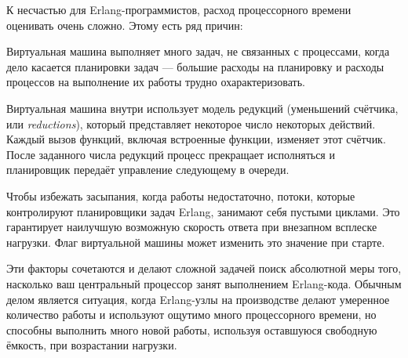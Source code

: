 \documentclass[11pt, oneside]{book}   	%
\begin{document}
К несчастью для Erlang-программистов, расход процессорного времени оценивать очень сложно. Этому есть ряд причин:

\begin{itemize*}
	\item Виртуальная машина выполняет много задач, не связанных с процессами, когда дело касается планировки задач --- большие расходы на планировку и расходы процессов на выполнение их работы трудно охарактеризовать.
	\item Виртуальная машина внутри использует модель редукций (уменьшений счётчика, или \emph{reductions}), который представляет некоторое число некоторых действий. Каждый вызов функций, включая встроенные функции, изменяет этот счётчик. После заданного числа редукций процесс прекращает исполняться и планировщик передаёт управление следующему в очереди.
	\item Чтобы избежать засыпания, когда работы недостаточно, потоки, которые контролируют планировщики задач Erlang, занимают себя пустыми циклами. Это гарантирует наилучшую возможную скорость ответа при внезапном всплеске нагрузки. Флаг виртуальной машины  может изменить это значение при старте.
\end{itemize*}

Эти факторы сочетаются и делают сложной задачей поиск абсолютной меры того, насколько ваш центральный процессор занят выполнением Erlang-кода. Обычным делом является ситуация, когда Erlang-узлы на производстве делают умеренное количество работы и используют ощутимо много процессорного времени, но способны выполнить много новой работы, используя оставшуюся свободную ёмкость, при возрастании нагрузки.
\end{document}
